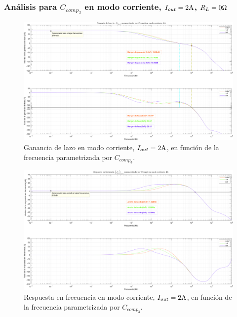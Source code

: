 \subsubsection{Análisis para $C_{comp_{3}}$ en modo corriente, $I_{out} = 2 \si[per-mode=symbol]{\ampere}$, $R_{L} = 0 \si[per-mode=symbol]{\ohm}$}

\clearpage

\begin{figure}[H] %
\begin{center}
\includegraphics[width=1.1 \textwidth, angle=90]{./img/plots/loop/power_supply_CCOMP3_LOOP_Modo3.png}
\caption{\label{fig:fig_power_supply_CCOMP3_LOOP_Modo3}\footnotesize{Ganancia de lazo en modo corriente, $I_{out} = 2 \si[per-mode=symbol]{\ampere}$, en función de la frecuencia parametrizada por $C_{comp_{3}}$.}}
\end{center}
\end{figure}


\clearpage

\begin{figure}[H] %
\begin{center}
\includegraphics[width=1.1 \textwidth, angle=90]{./img/plots/rf/power_supply_CCOMP3_RF_Modo3.png}
\caption{\label{fig:fig_power_supply_CCOMP3_RF_Modo3}\footnotesize{Respuesta en frecuencia en modo corriente, $I_{out} = 2 \si[per-mode=symbol]{\ampere}$, en función de la frecuencia parametrizada por $C_{comp_{3}}$.}}
\end{center}
\end{figure}

